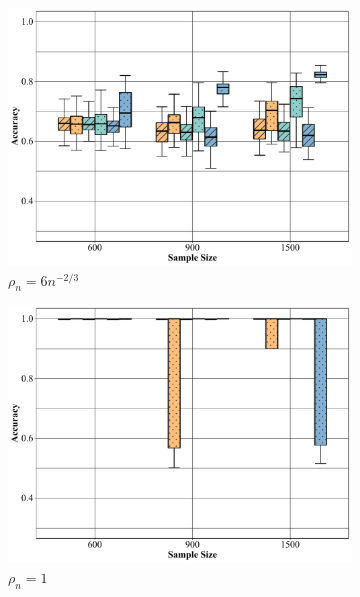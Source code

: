 \documentclass[10pt,journal,compsoc]{IEEEtran}
\numberwithin{equation}{section}
\begin{document}
\begin{figure}
\begin{subfigure}{.32\columnwidth}
\includegraphics[width=\columnwidth]{boxplot/dnb_23.pdf}%
\caption{$\rho_n = 6n^{-2/3}$}
\end{subfigure}
\par
\centering
\begin{subfigure}{.32\columnwidth}
\includegraphics[width=\columnwidth]{boxplot/db_d.pdf}%
\caption{$\rho_n = 1$}
\label{dense:4}
\end{subfigure}
\begin{subfigure}{.32\columnwidth}

\end{subfigure}
\end{figure}
\end{document}
